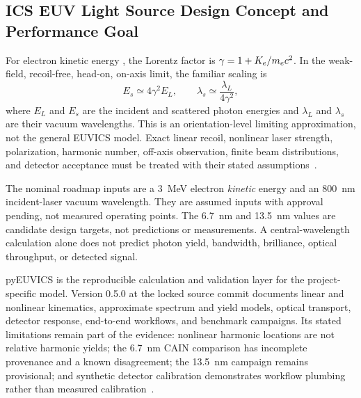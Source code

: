 \subsection{ICS EUV Light Source Design Concept and Performance Goal}

For electron kinetic energy \electronKineticEnergy{}, the Lorentz factor is
$\gamma=1+K_{e}/m_{e}c^{2}$. In the weak-field,
recoil-free, head-on, on-axis limit, the familiar scaling is
\[
  E_s\simeq4\gamma^2E_L,
  \qquad
  \lambda_s\simeq\frac{\lambda_L}{4\gamma^2},
\]
where $E_L$ and $E_s$ are the incident and scattered photon energies and
$\lambda_L$ and $\lambda_s$ are their vacuum wavelengths. This is an
orientation-level limiting approximation, not the general EUVICS model. Exact
linear recoil, nonlinear laser strength, polarization, harmonic number,
off-axis observation, finite beam distributions, and detector acceptance must
be treated with their stated assumptions~\cite{pyEUVICSConventions050,pyEUVICSEquations050}.

The nominal roadmap inputs are a 3~MeV electron \emph{kinetic} energy and an
800~nm incident-laser vacuum wavelength. They are assumed inputs with approval
pending, not measured operating points. The 6.7~nm and 13.5~nm values are
candidate design targets, not predictions or measurements. A central-wavelength
calculation alone does not predict photon yield, bandwidth, brilliance, optical
throughput, or detected signal.

pyEUVICS is the reproducible calculation and validation layer for the
project-specific model. Version 0.5.0 at the locked source commit documents
linear and nonlinear kinematics, approximate spectrum and yield models, optical
transport, detector response, end-to-end workflows, and benchmark campaigns.
Its stated limitations remain part of the evidence: nonlinear harmonic
locations are not relative harmonic yields; the 6.7~nm CAIN comparison has
incomplete provenance and a known disagreement; the 13.5~nm campaign remains
provisional; and synthetic detector calibration demonstrates workflow plumbing
rather than measured calibration~\cite{pyEUVICSModels050,pyEUVICSValidation050}.

\blankline
\blankline
